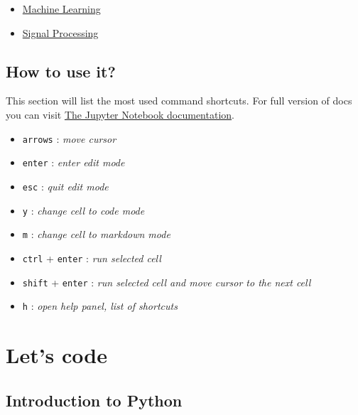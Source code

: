 \documentclass[11pt]{article}
\providecommand{\tightlist}{%
      \setlength{\itemsep}{0pt}\setlength{\parskip}{0pt}}
\begin{document}
\begin{itemize}
\tightlist
\item
  \href{https://nbviewer.jupyter.org/github/rhiever/Data-Analysis-and-Machine-Learning-Projects/blob/master/example-data-science-notebook/Example\%2520Machine\%2520Learning\%2520Notebook.ipynb}{Machine
  Learning}
\item
  \href{https://www.gw-openscience.org/s/events/GW150914/GW150914_tutorial.html}{Signal
  Processing}
\end{itemize}

\hypertarget{how-to-use-it}{%
\subsection{How to use it?}\label{how-to-use-it}}

This section will list the most used command shortcuts. For full version
of docs you can visit
\href{http://jupyter-notebook.readthedocs.io/en/latest/notebook.html}{The
Jupyter Notebook documentation}.

\begin{itemize}
\tightlist
\item
  \texttt{arrows} : \emph{move cursor}
\item
  \texttt{enter} : \emph{enter edit mode}
\item
  \texttt{esc} : \emph{quit edit mode}
\item
  \texttt{y} : \emph{change cell to code mode}
\item
  \texttt{m} : \emph{change cell to markdown mode}
\item
  \texttt{ctrl} + \texttt{enter} : \emph{run selected cell}
\item
  \texttt{shift} + \texttt{enter} : \emph{run selected cell and move
  cursor to the next cell}
\item
  \texttt{h} : \emph{open help panel, list of shortcuts}
\end{itemize}

    \hypertarget{lets-code}{%
\section{Let's code}\label{lets-code}}

\hypertarget{introduction-to-python}{%
\subsection{Introduction to Python}\label{introduction-to-python}}
\end{document}
